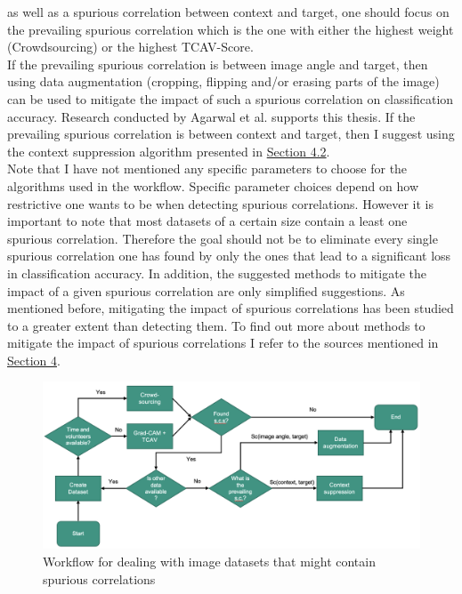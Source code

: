 \documentclass{article}
\begin{document}
as well as a spurious correlation between context and target, one should focus on the prevailing spurious correlation which is the one with either
the highest weight (Crowdsourcing) or the highest TCAV-Score. \\
If the prevailing spurious correlation is between image angle and target, then using data augmentation (cropping, flipping and/or erasing parts of the image)
can be used to mitigate the impact of such a spurious correlation on classification accuracy. Research conducted by Agarwal et al. \cite{Agarwal_2020_CVPR}
supports this thesis. 
If the prevailing spurious correlation is between context and target, then I suggest using the context suppression algorithm presented in
\hyperref[sec:contextSuppr]{Section 4.2}. \\
Note that I have not mentioned any specific parameters to choose for the algorithms used in the workflow. Specific parameter choices depend on how restrictive
one wants to be when detecting spurious correlations. However it is important to note that most datasets of a certain size contain a least one spurious correlation.
Therefore the goal should not be to eliminate every single spurious correlation one has found by only the ones that lead to a significant loss in
classification accuracy. In addition, the suggested methods to mitigate the impact of a given spurious correlation are only simplified suggestions.
As mentioned before, mitigating the impact of spurious correlations has been studied to a greater extent than detecting them. To find out more about methods
to mitigate the impact of spurious correlations I refer to the sources mentioned in \hyperref[sec:mitigatingscs]{Section 4}.


\begin{figure}
    \centering
    \includegraphics[scale=0.38]{sc_workflow.png}
    \caption{Workflow for dealing with image datasets that might contain spurious correlations}
    \label{fig:workflow}
\end{figure}
\end{document}
